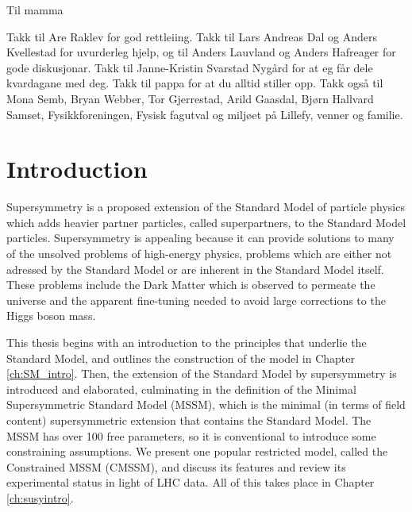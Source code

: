 \documentclass[twoside,english]{uiofysmaster}
\begin{document}

\begin{dedication}
Til mamma
\end{dedication}

\begin{acknowledgements}
Takk til Are Raklev for god rettleiing. Takk til Lars Andreas Dal og Anders Kvellestad for uvurderleg hjelp, og til Anders Lauvland og Anders Hafreager for gode diskusjonar. Takk til Janne-Kristin Svarstad Nyg{\aa}rd for at eg f{\aa}r dele kvardagane med deg. Takk til pappa for at du alltid stiller opp. Takk ogs{\aa} til Mona Semb, Bryan Webber, Tor Gjerrestad, Arild Gaasdal, Bj{\o}rn Hallvard Samset, Fysikkforeningen, Fysisk fagutval og milj{\o}et p{\aa} Lillefy, venner og familie. 
\end{acknowledgements}


\tableofcontents
\listoffigures
\listoftables

\cleardoublepage
{}

\chapter*{Introduction}
Supersymmetry is a proposed extension of the Standard Model of particle physics which adds heavier partner particles, called superpartners, to the Standard Model particles. Supersymmetry is appealing because it can provide solutions to many of the unsolved problems of high-energy physics, problems which are either not adressed by the Standard Model or are inherent in the Standard Model itself. These problems include the Dark Matter which is observed to permeate the universe and the apparent fine-tuning needed to avoid large corrections to the Higgs boson mass.

This thesis begins with an introduction to the principles that underlie the Standard Model, and outlines the construction of the model in Chapter \ref{ch:SM_intro}. Then, the extension of the Standard Model by supersymmetry is introduced and elaborated, culminating in the definition of the Minimal Supersymmetric Standard Model (MSSM), which is the minimal (in terms of field content) supersymmetric extension that contains the Standard Model. The MSSM has over 100 free parameters, so it is conventional to introduce some constraining assumptions. We present one popular restricted model, called the Constrained MSSM (CMSSM), and discuss its features and review its experimental status in light of LHC data. All of this takes place in Chapter \ref{ch:susyintro}.
\end{document}
